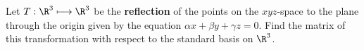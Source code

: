 \documentclass[]{article}
\begin{document}
Let $T:\R ^{3 }\longmapsto\R ^{3 }$ be the \textbf{reflection} of the points on the $xyz$-space to the plane through the origin given by the equation $\alpha x+\beta y + \gamma z = 0$. Find the matrix of this transformation with respect to the standard basis on $\R^{3}$.
\end{document}
